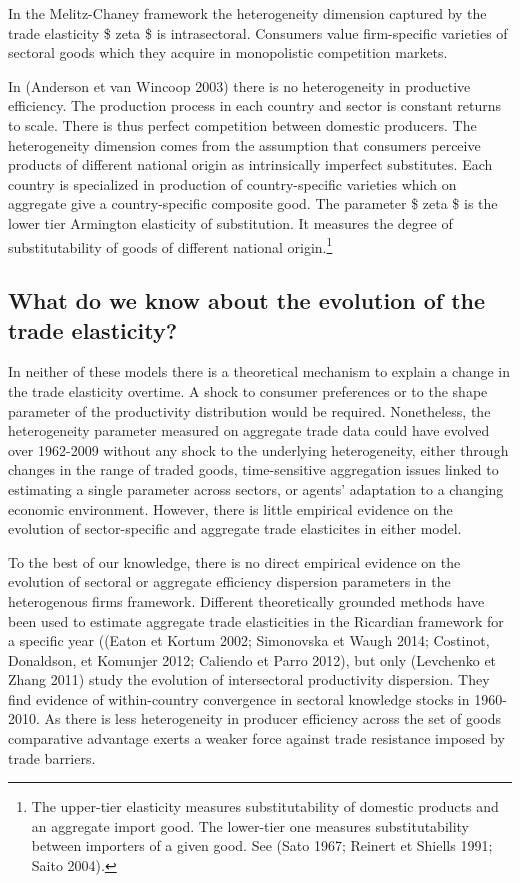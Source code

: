 \documentclass[12pt,twoside,a4paper,notitlepage]{article}
\begin{document}
In the Melitz-Chaney framework the heterogeneity dimension captured by the trade elasticity \$ zeta \$ is intrasectoral. Consumers value firm-specific varieties of sectoral goods which they acquire in monopolistic competition markets.

In (Anderson et van Wincoop 2003) there is no heterogeneity in productive efficiency. The production process in each country and sector is constant returns to scale. There is thus perfect competition between domestic producers. The heterogeneity dimension comes from the assumption that consumers perceive products of different national origin as intrinsically imperfect substitutes. Each country is specialized in production of country-specific varieties which on aggregate give a country-specific composite good. The parameter \$ zeta \$ is the lower tier Armington elasticity of substitution. It measures the degree of substitutability of goods of different national origin.\footnote{The upper-tier elasticity measures substitutability of domestic products and an aggregate import good. The lower-tier one measures substitutability between importers of a given good. See (Sato 1967; Reinert et Shiells 1991; Saito 2004).
} 

\subsection{What do we know about the evolution of the trade elasticity? \label{mark-1.2.}}

In neither of these models there is a theoretical mechanism to explain a change in the trade elasticity overtime. A shock to consumer preferences or to the shape parameter of the productivity distribution would be required. Nonetheless, the heterogeneity parameter measured on aggregate trade data could have evolved over 1962-2009 without any shock to the underlying heterogeneity, either through changes in the range of traded goods, time-sensitive aggregation issues linked to estimating a single parameter across sectors, or agents' adaptation to a changing economic environment. However, there is little empirical evidence on the evolution of sector-specific and aggregate trade elasticites in either model.

To the best of our knowledge, there is no direct empirical evidence on the evolution of sectoral or aggregate efficiency dispersion parameters in the heterogenous firms framework. Different theoretically grounded methods have been used to estimate aggregate trade elasticities in the Ricardian framework for a specific year ((Eaton et Kortum 2002; Simonovska et Waugh 2014; Costinot, Donaldson, et Komunjer 2012; Caliendo et Parro 2012), but only (Levchenko et Zhang 2011) study the evolution of intersectoral productivity dispersion. They find evidence of within-country convergence in sectoral knowledge stocks in 1960-2010. As there is less heterogeneity in producer efficiency across the set of goods comparative advantage exerts a weaker force against trade resistance imposed by trade barriers.
\end{document}
